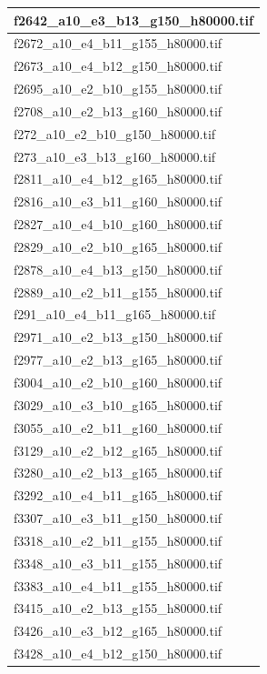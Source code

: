 \documentclass[12pt, twoside]{article}
\begin{document}
\begin{appendices}
\begin{longtable}{|l|}
		f2642\_a10\_e3\_b13\_g150\_h80000.tif \\ \hline 
		f2672\_a10\_e4\_b11\_g155\_h80000.tif \\ \hline 
		f2673\_a10\_e4\_b12\_g150\_h80000.tif \\ \hline 
		f2695\_a10\_e2\_b10\_g155\_h80000.tif \\ \hline 
		f2708\_a10\_e2\_b13\_g160\_h80000.tif \\ \hline 
		f272\_a10\_e2\_b10\_g150\_h80000.tif \\ \hline 
		f273\_a10\_e3\_b13\_g160\_h80000.tif \\ \hline 
		f2811\_a10\_e4\_b12\_g165\_h80000.tif \\ \hline 
		f2816\_a10\_e3\_b11\_g160\_h80000.tif \\ \hline 
		f2827\_a10\_e4\_b10\_g160\_h80000.tif \\ \hline 
		f2829\_a10\_e2\_b10\_g165\_h80000.tif \\ \hline 
		f2878\_a10\_e4\_b13\_g150\_h80000.tif \\ \hline 
		f2889\_a10\_e2\_b11\_g155\_h80000.tif \\ \hline 
		f291\_a10\_e4\_b11\_g165\_h80000.tif \\ \hline 
		f2971\_a10\_e2\_b13\_g150\_h80000.tif \\ \hline 
		f2977\_a10\_e2\_b13\_g165\_h80000.tif \\ \hline 
		f3004\_a10\_e2\_b10\_g160\_h80000.tif \\ \hline 
		f3029\_a10\_e3\_b10\_g165\_h80000.tif \\ \hline 
		f3055\_a10\_e2\_b11\_g160\_h80000.tif \\ \hline 
		f3129\_a10\_e2\_b12\_g165\_h80000.tif \\ \hline 
		f3280\_a10\_e2\_b13\_g165\_h80000.tif \\ \hline 
		f3292\_a10\_e4\_b11\_g165\_h80000.tif \\ \hline 
		f3307\_a10\_e3\_b11\_g150\_h80000.tif \\ \hline 
		f3318\_a10\_e2\_b11\_g155\_h80000.tif \\ \hline 
		f3348\_a10\_e3\_b11\_g155\_h80000.tif \\ \hline 
		f3383\_a10\_e4\_b11\_g155\_h80000.tif \\ \hline 
		f3415\_a10\_e2\_b13\_g155\_h80000.tif \\ \hline 
		f3426\_a10\_e3\_b12\_g165\_h80000.tif \\ \hline 
		f3428\_a10\_e4\_b12\_g150\_h80000.tif \\ \hline 

\end{longtable}
\end{appendices}
\end{document}
